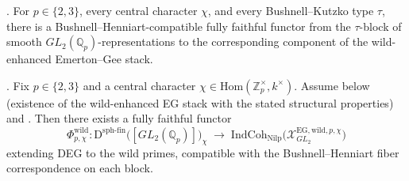 \begin{conjecture}
\label{v4-arith:deg-f1a:conj:wild-block-functor}
\ClaimStatusConjectured. For \(p\in\{2,3\}\), every central character
\(\chi\), and every Bushnell--Kutzko type \(\tau\), there is a
Bushnell--Henniart-compatible fully faithful functor from the
\(\tau\)-block of smooth \(GL_{2}(\mathbb Q_p)\)-representations to
the corresponding component of the wild-enhanced Emerton--Gee stack.
\end{conjecture}

\begin{theorem}[existence of wild DEG functor at \(p=2,3\)]
\label{v4-arith:deg-f1a:thm:wild-functor-existence}
\ClaimStatusProvedHereConditional. Fix \(p\in\{2,3\}\) and a central
character \(\chi\in\mathrm{Hom}(\mathbb{Z}_{p}^{\times},k^{\times})\).
Assume  below
(existence of the wild-enhanced EG stack with the stated structural
properties) and
. Then there exists a
fully faithful functor
\begin{equation}
\label{v4-arith:deg-f1a:eq:wild-functor}
\Phi^{\mathrm{wild}}_{p,\chi}\colon
\mathrm{D}^{\mathrm{sph\text{-}fin}}\bigl([GL_{2}(\mathbb{Q}_{p})]\bigr)_{\chi}
\;\longrightarrow\;\mathrm{IndCoh}_{\mathrm{Nilp}}\bigl(\mathcal{X}^{\mathrm{EG,wild},p,\chi}_{GL_{2}}\bigr)
\end{equation}
extending DEG to the wild primes, compatible with the
Bushnell--Henniart fiber correspondence on each block.
\end{theorem}

